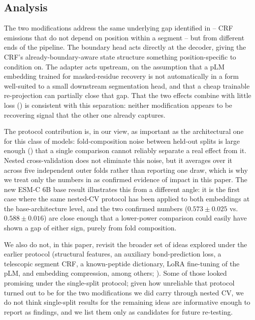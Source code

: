 \documentclass{article}
\begin{document}
\subsection{Analysis}
\label{sec:analysis}

The two modifications address the same underlying gap identified in  -- CRF emissions that do not depend on position within a segment -- but from different ends of the pipeline. The boundary head acts directly at the decoder, giving the CRF's already-boundary-aware state structure something position-specific to condition on. The adapter acts upstream, on the assumption that a pLM embedding trained for masked-residue recovery is not automatically in a form well-suited to a small downstream segmentation head, and that a cheap trainable re-projection can partially close that gap. That the two effects combine with little loss () is consistent with this separation: neither modification appears to be recovering signal that the other one already captures.

The protocol contribution is, in our view, as important as the architectural one for this class of models: fold-composition noise between held-out splits is large enough () that a single comparison cannot reliably separate a real effect from it. Nested cross-validation does not eliminate this noise, but it averages over it across five independent outer folds rather than reporting one draw, which is why we treat only the numbers in  as confirmed evidence of impact in this paper. The new ESM-C 6B base result illustrates this from a different angle: it is the first case where the same nested-CV protocol has been applied to both embeddings at the base-architecture level, and the two confirmed numbers ($0.573\pm0.025$ vs.\ $0.588\pm0.016$) are close enough that a lower-power comparison could easily have shown a gap of either sign, purely from fold composition.

We also do not, in this paper, revisit the broader set of ideas explored under the earlier protocol (structural features, an auxiliary bond-prediction loss, a telescopic segment CRF, a known-peptide dictionary, LoRA fine-tuning of the pLM, and embedding compression, among others; ). Some of those looked promising under the single-split protocol; given how unreliable that protocol turned out to be for the two modifications we did carry through nested CV, we do not think single-split results for the remaining ideas are informative enough to report as findings, and we list them only as candidates for future re-testing.
\end{document}
